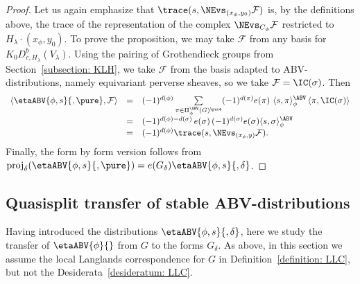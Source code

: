 \documentclass[11pt,letterpaper]{amsart}
\numberwithin{equation}{section}
\begin{document}
\begin{proof}
Let us again emphasize that $\trace({s},\NEvs_{(x_\phi,y_0)} \mathcal{F})$ is, by the definitions above, the trace of the representation of the complex $\NEvs_{C_\phi} \mathcal{F}$
 restricted to $H_\lambda\cdot(x_\phi,y_0)$.
 To prove the proposition, we may take $\mathcal{F}$ from any basis for $K_0 D^b_{c,H_\lambda}(V_\lambda)$. 
Using the pairing of Grothendieck groups from Section~\ref{subsection: KLH}, we take $\mathcal{F}$ from the basis adapted to ABV-distributions, namely equivariant perverse sheaves, so we take $\mathcal{F} = \IC(\sigma)$.
Then
\[
\begin{array}{rcl}
\langle
\etaABV{\phi,s}{,\pure}, \mathcal{F}
\rangle
&=& 
(-1)^{d(\phi)} \mathop{\sum}\limits_{\pi\in \Pi_\phi^\ABV(G)^\pure} (-1)^{d(\pi)} e(\pi) \ \langle {s}, \pi\rangle_{\phi}^\ABV\, 
\langle \pi, \IC(\sigma)\rangle \\
&=& 
(-1)^{d(\phi)-d(\sigma)}\, e(\sigma) \, (-1)^{d(\sigma)} e(\sigma)
\langle {s}, \sigma\rangle_{\phi}^\ABV \\
&=&
(-1)^{d(\phi)}
\trace({s},\NEvs_{(x_\phi,y)} \mathcal{F}).
\end{array}
\]
Finally, the form by form version follows from $\operatorname{proj}_{\delta}( \etaABV{\phi,s}{,\pure})= e(G_{\delta})\etaABV{\phi,s}{,\delta}$.
\end{proof}


\subsection{Quasisplit transfer of stable ABV-distributions}\label{ssec: proof of prop QST}

Having introduced the distributions $\etaABV{\phi,s}{,\delta}$, here we study the transfer of $\etaABV{\phi}{}$ from $G$ to the forms $G_\delta$.
As above, in this section we assume the local Langlands correspondence for $G$ in Definition~\ref{definition: LLC}, but not the Desiderata~\ref{desideratum: LLC}.
\end{document}
